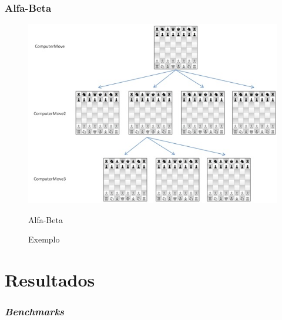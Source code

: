 \documentclass[yellow]{beamer}
\begin{document}
\begin{frame}
  \frametitle{Alfa-Beta}
  \begin{figure}[!hpbt]
	  \centering
	  \begin{minipage}{1\textwidth}
		    \centering
		      \includegraphics[width=.8\linewidth]{huoChess_2.jpg}
		        \caption{Exemplo}{Alfa-Beta}
			  \label{fig:1}
		  \end{minipage}
	  \end{figure}
  \end{frame}


\section{Resultados}


\begin{frame}
	\frametitle{\textit{Benchmarks}}
\end{frame}
\end{document}
